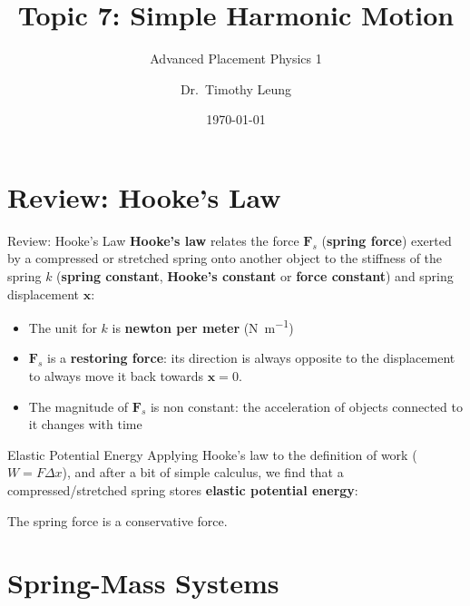 \documentclass[12pt,compress,aspectratio=169]{beamer}
\title{Topic 7: Simple Harmonic Motion}
\subtitle{Advanced Placement Physics 1}
\author[TML]{Dr.\ Timothy Leung}
\institute{Olympiads School}
\date{\today}
\newcommand{\eq}[2]{\vspace{#1}{\Large\begin{displaymath}#2\end{displaymath}}}
\begin{document}
\begin{frame}
  \maketitle
\end{frame}


\section{Review: Hooke's Law}

\begin{frame}{Review: Hooke's Law}
  \textbf{Hooke's law} relates the force $\bm{F}_s$ (\textbf{spring force})
  exerted by a compressed or stretched spring onto another object to the
  stiffness of the spring $k$ (\textbf{spring constant}, \textbf{Hooke's
    constant} or \textbf{force constant}) and spring displacement $\bm{x}$:

  \eq{-.1in}{
    \boxed{\bm{F}_s=-k\bm{x}}
  }

  \begin{itemize}
  \item\vspace{-.1in}The unit for $k$ is \textbf{newton per meter}
    (\si{\newton\per\metre})
  \item $\bm{F}_s$ is a \textbf{restoring force}: its direction is always
    opposite to the displacement to always move it back towards $\bm{x}=0$.
  \item The magnitude of $\bm{F}_s$ is non constant: the acceleration of
    objects connected to it changes with time
  \end{itemize}
\end{frame}



\begin{frame}{Elastic Potential Energy}
  Applying Hooke's law to the  definition of work ($W=F\Delta x$), and after a
  bit of simple calculus, we find that a compressed/stretched spring stores
  \textbf{elastic potential energy}:
  
  \eq{-.1in}{
    \boxed{U_e=\frac12kx^2}
  }

  The spring force is a conservative force.
\end{frame}



\section{Spring-Mass Systems}
\end{document}
